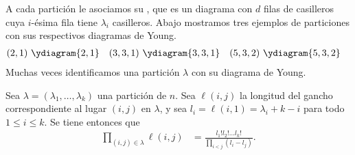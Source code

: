 \documentclass[11pt,fleqn]{article}
\begin{document}
A cada partición le asociamos su , que es un diagrama con $d$
filas de casilleros cuya $i$-ésima fila tiene $\lambda_i$ casilleros. Abajo mostramos
tres ejemplos de particiones con sus respectivos diagramas de Young.
\begin{align*}
	(2,1) & \ \ydiagram{2,1} 
		& (3,3,1) & \ \ydiagram{3, 3, 1} 
		& (5,3,2)\  & \ydiagram{5, 3, 2}
\end{align*}
Muchas veces identificamos una partición $\lambda$ con su diagrama de Young.

\begin{Proposition}
\label{hook-length-formula}
Sea $\lambda = (\lambda_1, \ldots, \lambda_k)$ una partición de $n$. Sea $\ell(i,j)$ la
longitud del gancho correspondiente al lugar $(i,j)$ en $\lambda$, y sea $l_i = \ell(i,1)
= \lambda_i + k - i$ para todo $1 \leq i \leq k$. Se tiene entonces que
\begin{align*}
	\prod_{(i,j) \in \lambda} \ell(i,j) &= \frac{l_1! l_2! \ldots l_k!}{\prod_{i<j} (l_i -
		l_j)}.
\end{align*}
\end{Proposition}
\end{document}
